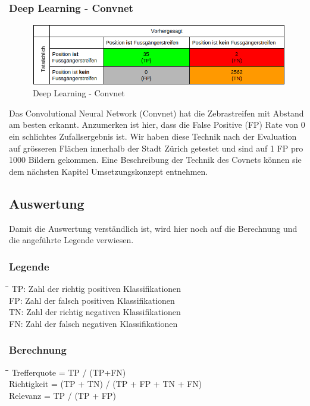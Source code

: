 \subsubsection{Deep Learning - Convnet}	
\begin{figure}[H]
\includegraphics[width=\textwidth]{images/deep_conf.png}
\caption[Deep Learning]{Deep Learning - Convnet}
\end{figure}
Das Convolutional Neural Network (Convnet) hat die Zebrastreifen mit Abstand am besten erkannt. Anzumerken ist hier, dass die False Positive (FP) Rate von 0 ein schlichtes Zufallsergebnis ist. Wir haben diese Technik nach der Evaluation auf grösseren Flächen innerhalb der Stadt Zürich getestet und sind auf 1 FP pro 1000 Bildern gekommen. Eine Beschreibung der Technik des Covnets können sie dem nächsten Kapitel Umsetzungskonzept entnehmen.

\subsection{Auswertung}
Damit die Auswertung verständlich ist, wird hier noch auf die Berechnung und die angeführte Legende verwiesen.
\subsubsection{Legende}
\begin{tabbing}
    \hspace*{3cm}\=\hspace*{6cm}\= \kill
    TP:	\> Zahl der richtig positiven Klassifikationen\\
	FP:	\> Zahl der falsch positiven Klassifikationen\\
	TN:	\> Zahl der richtig negativen Klassifikationen\\
	FN:	\> Zahl der falsch negativen Klassifikationen\\
\end{tabbing}

\subsubsection{Berechnung}
\begin{tabbing}
    \hspace*{3cm}\=\hspace*{3cm}\=\hspace*{6cm}\= \kill
	Trefferquote \> = \> TP / (TP+FN)\\
	Richtigkeit \> = \> (TP + TN) / (TP + FP + TN + FN)\\
	Relevanz \> = \> TP / (TP + FP)\\
\end{tabbing}

